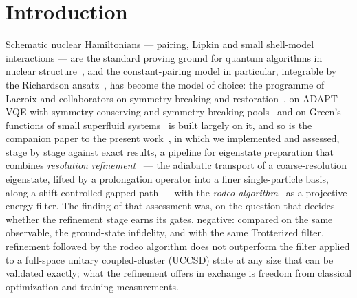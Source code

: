 \documentclass[
  aps,            %
  prc,            %
  reprint,        %
  superscriptaddress,
  floatfix,
  nofootinbib
]{revtex4-2}
\begin{document}
\section{Introduction}
Schematic nuclear Hamiltonians --- pairing, Lipkin and small shell-model
interactions --- are the standard proving ground for quantum algorithms in
nuclear structure~\cite{Beck2023,Bauer2023,LeeReview2023,Ovrum2007,Hlatshwayo2022,Stetcu2022,PerezObiol2023,Jiang2023,Zhang2024,Lacroix2023},
and the constant-pairing model in particular, integrable by the Richardson
ansatz~\cite{Richardson1963,RichardsonSherman1964,Dukelsky2004}, has become
the model of choice: the programme of Lacroix and collaborators on symmetry
breaking and restoration~\cite{Lacroix2020,RuizGuzman2022,RuizGuzman2023,RuizGuzman2024,Lacroix2023EPJA,Ayral2023},
on ADAPT-VQE with symmetry-conserving and symmetry-breaking
pools~\cite{Zhang2024,Zhang2025} and on Green's functions of small
superfluid systems~\cite{AychetClaisse2026} is built largely on it, and so is
the companion paper to the present work~\cite{PairingCompanion}, in which we
implemented and assessed, stage by stage against exact results, a pipeline
for eigenstate preparation that combines \emph{resolution
refinement}~\cite{Bogner2026} --- the adiabatic transport of a
coarse-resolution eigenstate, lifted by a prolongation operator into a finer
single-particle basis, along a shift-controlled gapped path --- with the
\emph{rodeo algorithm}~\cite{Choi2021,Qian2024} as a projective energy
filter.  The finding of that assessment was, on the question that decides
whether the refinement stage earns its gates, negative: compared on the same
observable, the ground-state infidelity, and with the same Trotterized
filter, refinement followed by the rodeo algorithm does not outperform the
filter applied to a full-space unitary coupled-cluster (UCCSD) state at any
size that can be validated exactly; what the refinement offers in exchange
is freedom from classical optimization and training measurements.
\end{document}
